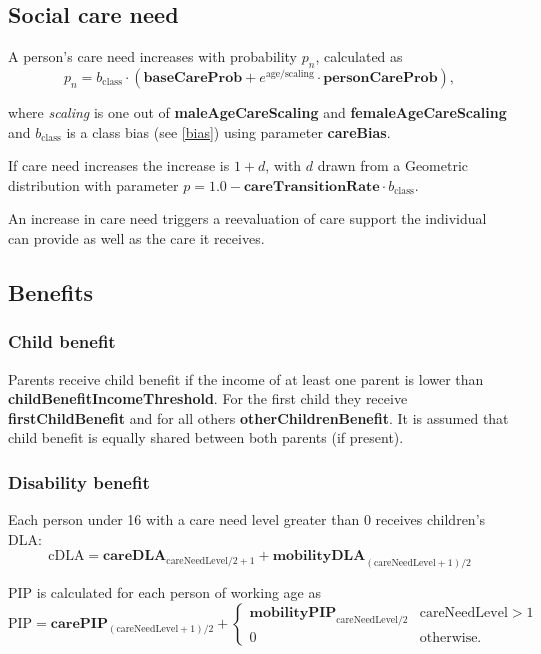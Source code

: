 \documentclass{article}
\begin{document}
\subsection{Social care need}

A person's care need increases with probability $p_n$, calculated as
\[
p_n = b_\textrm{class} \cdot (\textbf{baseCareProb} + e^{\textrm{age}/\textrm{scaling}} \cdot \textbf{personCareProb} ),
\]

where \textit{scaling} is one out of \textbf{maleAgeCareScaling} and \textbf{femaleAgeCareScaling} and $b_\textrm{class}$ is a class bias (see \ref{bias}) using parameter \textbf{careBias}.

If care need increases the increase is $1+d$, with $d$ drawn from a Geometric distribution with parameter $p=1.0 - \textbf{careTransitionRate}\cdot b_\textrm{class}$.

An increase in care need triggers a reevaluation of care support the individual can provide as well as the care it receives.

\subsection{Benefits}


\subsubsection*{Child benefit}

Parents receive child benefit if the income of at least one parent is lower than \textbf{childBenefitIncomeThreshold}. For the first child they receive \textbf{firstChildBenefit} and for all others \textbf{otherChildrenBenefit}. It is assumed that child benefit is equally shared between both parents (if present).

\subsubsection*{Disability benefit}

Each person under 16 with a care need level greater than 0 receives children's DLA:
\[
\textrm{cDLA} = \textbf{careDLA}_{\textrm{careNeedLevel}/2+1} + \textbf{mobilityDLA}_{(\textrm{careNeedLevel}+1)/2}
\]

PIP is calculated for each person of working age as
\[
\textrm{PIP} = \textbf{carePIP}_{(\textrm{careNeedLevel}+1)/2} +
	\left\{\begin{array}{ll}
		\textbf{mobilityPIP}_{\textrm{careNeedLevel}/2} & \textrm{careNeedLevel}>1\\
		0 & \textrm{otherwise.}
		\end{array}\right.
\]
\end{document}
